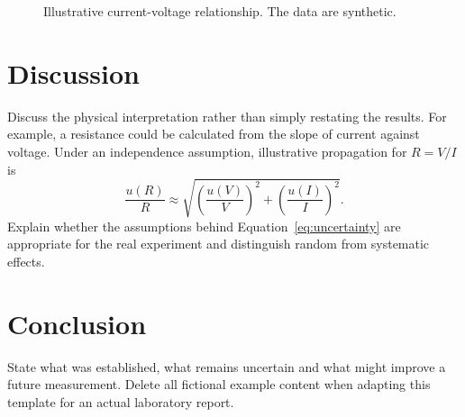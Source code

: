 \documentclass[11pt,a4paper]{article}
\begin{document}
\begin{figure}[htbp]
    \centering
    \caption{Illustrative current-voltage relationship. The data are synthetic.}
    \label{fig:current-voltage}
\end{figure}

\section{Discussion}
\label{sec:discussion}
Discuss the physical interpretation rather than simply restating the results.
For example, a resistance could be calculated from the slope of current
against voltage. Under an independence assumption, illustrative propagation
for \(R=V/I\) is
\begin{equation}
    \frac{u(R)}{R}
    \approx
    \sqrt{\left(\frac{u(V)}{V}\right)^2+
          \left(\frac{u(I)}{I}\right)^2}.
    \label{eq:uncertainty}
\end{equation}
Explain whether the assumptions behind Equation~\eqref{eq:uncertainty} are
appropriate for the real experiment and distinguish random from systematic
effects.

\section{Conclusion}
State what was established, what remains uncertain and what might improve a
future measurement. Delete all fictional example content when adapting this
template for an actual laboratory report.



\end{document}
